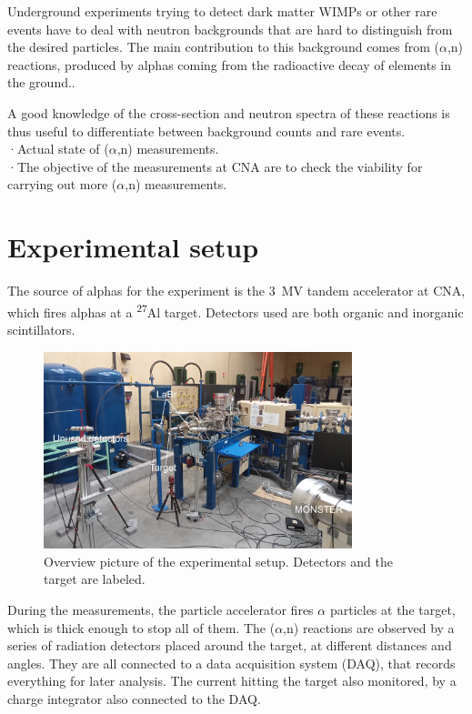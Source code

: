 \documentclass[a4paper,12pt]{report}
\newcommand{\an}{($\alpha$,n) }
\newcommand{\Aliso}{\textsuperscript{27}Al }
\begin{document}
Underground experiments trying to detect dark matter WIMPs or other rare events have to deal with neutron backgrounds that are hard to distinguish from the desired particles.
The main contribution to this background comes from \an reactions, produced by alphas coming from the radioactive decay of elements in the ground.\cite{neutron_in_an}.	%

A good knowledge of the cross-section and neutron spectra of these reactions is thus useful to differentiate between background counts and rare events.
\\

·Actual state of \an measurements.\\

·The objective of the measurements at CNA are to check the viability for carrying out more \an measurements.\\


\chapter{Experimental setup}
The source of alphas for the experiment is the \qty{3}{\mega\volt} tandem accelerator at CNA, which fires alphas at a \Aliso target.
Detectors used are both organic and inorganic scintillators.

\begin{figure}[H]
	\centering
	\includegraphics[width=0.80\textwidth]{overview_photo.jpg}
	\caption{Overview picture of the experimental setup.
	Detectors and the target are labeled.}
	\label{overview_photo}
\end{figure}

During the measurements, the particle accelerator fires $\alpha$ particles at the target, which is thick enough to stop all of them.
The \an reactions are observed by a series of radiation detectors placed around the target, at different distances and angles.
They are all connected to a data acquisition system (DAQ), that records everything for later analysis.
The current hitting the target also monitored, by a charge integrator also connected to the DAQ.
\end{document}
